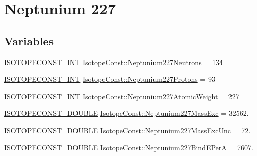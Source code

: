 \hypertarget{group___isotope_const-_neptunium-_np227}{}\section{Neptunium 227}
\label{group___isotope_const-_neptunium-_np227}
\subsection*{Variables}
\begin{DoxyCompactItemize}
\item 
\mbox{\hyperlink{group___isotope_const-_macros_ga5f18360b3e99483a35c32d789e62621c}{I\+S\+O\+T\+O\+P\+E\+C\+O\+N\+S\+T\+\_\+\+I\+NT}} \mbox{\hyperlink{group___isotope_const-_neptunium-_np227_ga76857ddbb6b613d59ae615852bc15f0a}{Isotope\+Const\+::\+Neptunium227\+Neutrons}} = 134
\item 
\mbox{\hyperlink{group___isotope_const-_macros_ga5f18360b3e99483a35c32d789e62621c}{I\+S\+O\+T\+O\+P\+E\+C\+O\+N\+S\+T\+\_\+\+I\+NT}} \mbox{\hyperlink{group___isotope_const-_neptunium-_np227_gad88d6009e7dbb930a28fc3cc5fe13db3}{Isotope\+Const\+::\+Neptunium227\+Protons}} = 93
\item 
\mbox{\hyperlink{group___isotope_const-_macros_ga5f18360b3e99483a35c32d789e62621c}{I\+S\+O\+T\+O\+P\+E\+C\+O\+N\+S\+T\+\_\+\+I\+NT}} \mbox{\hyperlink{group___isotope_const-_neptunium-_np227_ga7c8313ab54fb4069b14f7b35d08713e8}{Isotope\+Const\+::\+Neptunium227\+Atomic\+Weight}} = 227
\item 
\mbox{\hyperlink{group___isotope_const-_macros_ga8f45a7272ce02c0b4c65c44636ed719a}{I\+S\+O\+T\+O\+P\+E\+C\+O\+N\+S\+T\+\_\+\+D\+O\+U\+B\+LE}} \mbox{\hyperlink{group___isotope_const-_neptunium-_np227_ga2987f1c230b0526a5a9dfbf3b077e48c}{Isotope\+Const\+::\+Neptunium227\+Mass\+Exc}} = 32562.
\item 
\mbox{\hyperlink{group___isotope_const-_macros_ga8f45a7272ce02c0b4c65c44636ed719a}{I\+S\+O\+T\+O\+P\+E\+C\+O\+N\+S\+T\+\_\+\+D\+O\+U\+B\+LE}} \mbox{\hyperlink{group___isotope_const-_neptunium-_np227_ga22e377312bcd4f93d1aea5c63d53a407}{Isotope\+Const\+::\+Neptunium227\+Mass\+Exc\+Unc}} = 72.
\item 
\mbox{\hyperlink{group___isotope_const-_macros_ga8f45a7272ce02c0b4c65c44636ed719a}{I\+S\+O\+T\+O\+P\+E\+C\+O\+N\+S\+T\+\_\+\+D\+O\+U\+B\+LE}} \mbox{\hyperlink{group___isotope_const-_neptunium-_np227_ga9c1a80eceda78c648203437b9a847d81}{Isotope\+Const\+::\+Neptunium227\+Bind\+E\+PerA}} = 7607.
\item 

\end{DoxyCompactItemize}
